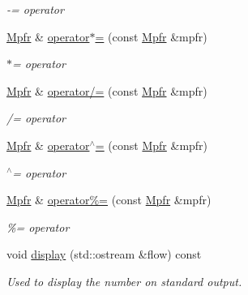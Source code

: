\begin{DoxyCompactItemize}
\begin{DoxyCompactList}\small\item\em -\/= operator \end{DoxyCompactList}\item 
\hypertarget{class_mpfr_af8ccd26d4a10f6ee4d90a28931fef3ab}{}\hyperlink{class_mpfr}{Mpfr} \& \hyperlink{class_mpfr_af8ccd26d4a10f6ee4d90a28931fef3ab}{operator$\ast$=} (const \hyperlink{class_mpfr}{Mpfr} \&mpfr)\label{class_mpfr_af8ccd26d4a10f6ee4d90a28931fef3ab}

\begin{DoxyCompactList}\small\item\em $\ast$= operator \end{DoxyCompactList}\item 
\hypertarget{class_mpfr_a452fad23d4f1c4523a46f74385dc8eae}{}\hyperlink{class_mpfr}{Mpfr} \& \hyperlink{class_mpfr_a452fad23d4f1c4523a46f74385dc8eae}{operator/=} (const \hyperlink{class_mpfr}{Mpfr} \&mpfr)\label{class_mpfr_a452fad23d4f1c4523a46f74385dc8eae}

\begin{DoxyCompactList}\small\item\em /= operator \end{DoxyCompactList}\item 
\hypertarget{class_mpfr_a3d9ac24ba33150a212eff8d5865e482b}{}\hyperlink{class_mpfr}{Mpfr} \& \hyperlink{class_mpfr_a3d9ac24ba33150a212eff8d5865e482b}{operator$^\wedge$=} (const \hyperlink{class_mpfr}{Mpfr} \&mpfr)\label{class_mpfr_a3d9ac24ba33150a212eff8d5865e482b}

\begin{DoxyCompactList}\small\item\em $^\wedge$= operator \end{DoxyCompactList}\item 
\hypertarget{class_mpfr_a76042ce09d6baaa2b76ff61ea1cc6bf4}{}\hyperlink{class_mpfr}{Mpfr} \& \hyperlink{class_mpfr_a76042ce09d6baaa2b76ff61ea1cc6bf4}{operator\%=} (const \hyperlink{class_mpfr}{Mpfr} \&mpfr)\label{class_mpfr_a76042ce09d6baaa2b76ff61ea1cc6bf4}

\begin{DoxyCompactList}\small\item\em \%= operator \end{DoxyCompactList}\item 
\hypertarget{class_mpfr_aa4d6146cf138cd0b954b4574667d8eeb}{}void \hyperlink{class_mpfr_aa4d6146cf138cd0b954b4574667d8eeb}{display} (std\+::ostream \&flow) const \label{class_mpfr_aa4d6146cf138cd0b954b4574667d8eeb}

\begin{DoxyCompactList}\small\item\em Used to display the number on standard output. \end{DoxyCompactList}\end{DoxyCompactItemize}
